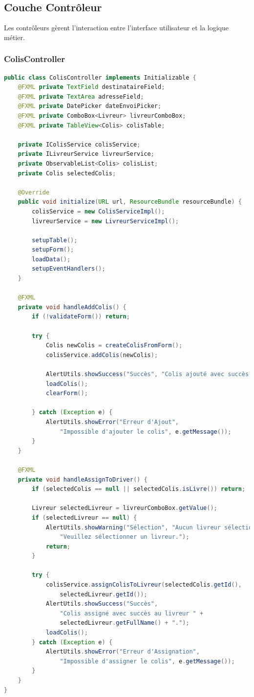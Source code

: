 \documentclass{rapportENSIAS}
\begin{document}
\subsection{Couche Contr\^{o}leur}

Les contr\^{o}leurs g\`{e}rent l'interaction entre l'interface utilisateur et la logique m\'{e}tier.

\subsubsection{ColisController}

\begin{lstlisting}[language=Java, caption=Contr\^{o}leur Colis (extrait)]
public class ColisController implements Initializable {
    @FXML private TextField destinataireField;
    @FXML private TextArea adresseField;
    @FXML private DatePicker dateEnvoiPicker;
    @FXML private ComboBox<Livreur> livreurComboBox;
    @FXML private TableView<Colis> colisTable;
    
    private IColisService colisService;
    private ILivreurService livreurService;
    private ObservableList<Colis> colisList;
    private Colis selectedColis;
    
    @Override
    public void initialize(URL url, ResourceBundle resourceBundle) {
        colisService = new ColisServiceImpl();
        livreurService = new LivreurServiceImpl();
        
        setupTable();
        setupForm();
        loadData();
        setupEventHandlers();
    }
    
    @FXML
    private void handleAddColis() {
        if (!validateForm()) return;
        
        try {
            Colis newColis = createColisFromForm();
            colisService.addColis(newColis);
            
            AlertUtils.showSuccess("Succès", "Colis ajouté avec succès.");
            loadColis();
            clearForm();
            
        } catch (Exception e) {
            AlertUtils.showError("Erreur d'Ajout", 
                "Impossible d'ajouter le colis", e.getMessage());
        }
    }
    
    @FXML
    private void handleAssignToDriver() {
        if (selectedColis == null || selectedColis.isLivre()) return;
        
        Livreur selectedLivreur = livreurComboBox.getValue();
        if (selectedLivreur == null) {
            AlertUtils.showWarning("Sélection", "Aucun livreur sélectionné", 
                "Veuillez sélectionner un livreur.");
            return;
        }
        
        try {
            colisService.assignColisToLivreur(selectedColis.getId(), 
                selectedLivreur.getId());
            AlertUtils.showSuccess("Succès", 
                "Colis assigné avec succès au livreur " + 
                selectedLivreur.getFullName() + ".");
            loadColis();
        } catch (Exception e) {
            AlertUtils.showError("Erreur d'Assignation", 
                "Impossible d'assigner le colis", e.getMessage());
        }
    }
}
\end{lstlisting}
\end{document}
